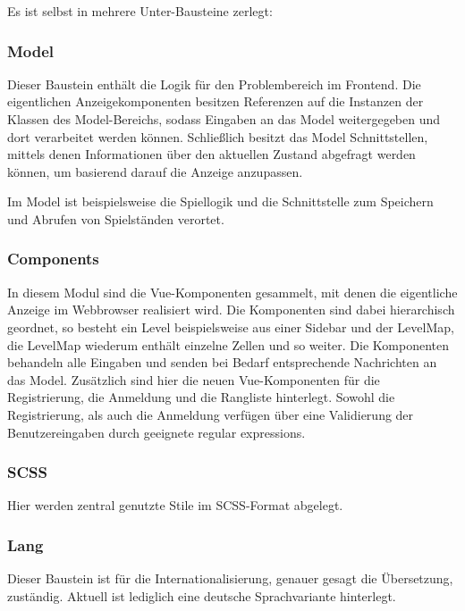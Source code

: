 \documentclass[letterpaper, 10 pt, conference]{ieeeconf}
\begin{document}
Es ist selbst in mehrere Unter-Bausteine zerlegt:

\subsubsection{Model}

Dieser Baustein enthält die Logik für den Problembereich im Frontend.
Die eigentlichen Anzeigekomponenten besitzen Referenzen auf die Instanzen der Klassen des Model-Bereichs,
sodass Eingaben an das Model weitergegeben und dort verarbeitet werden können.
Schließlich besitzt das Model Schnittstellen, mittels denen Informationen über den aktuellen Zustand abgefragt werden können,
um basierend darauf die Anzeige anzupassen.

Im Model ist beispielsweise die Spiellogik und die Schnittstelle zum Speichern und Abrufen von Spielständen verortet.

\subsubsection{Components}

In diesem Modul sind die Vue-Komponenten gesammelt, mit denen die eigentliche Anzeige im Webbrowser realisiert wird.
Die Komponenten sind dabei hierarchisch geordnet, so besteht ein Level beispielsweise aus einer Sidebar und der LevelMap, die LevelMap wiederum enthält einzelne Zellen und so weiter.
Die Komponenten behandeln alle Eingaben und senden bei Bedarf entsprechende Nachrichten an das Model.
Zusätzlich sind hier die neuen Vue-Komponenten für die Registrierung, die Anmeldung und die Rangliste hinterlegt.
Sowohl die Registrierung, als auch die Anmeldung verfügen über eine Validierung der Benutzereingaben durch geeignete regular expressions.

\subsubsection{SCSS}

Hier werden zentral genutzte Stile im SCSS-Format abgelegt.

\subsubsection{Lang}

Dieser Baustein ist für die Internationalisierung, genauer gesagt die Übersetzung, zuständig.
Aktuell ist lediglich eine deutsche Sprachvariante hinterlegt.
\end{document}
